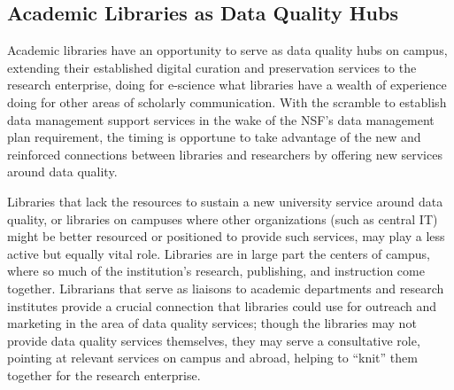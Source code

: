 \documentclass[jou,12pt]{apa6}
\begin{document}
\subsection{Academic Libraries as Data Quality Hubs}

Academic libraries have an opportunity to serve as data quality hubs
on campus, extending their established digital curation and
preservation services to the research enterprise, doing for e-science
what libraries have a wealth of experience doing for other areas of
scholarly communication. With the scramble to establish data
management support services in the wake of the NSF's data management
plan requirement, the timing is opportune to take advantage of the new
and reinforced connections between libraries and researchers by
offering new services around data quality.

%

Libraries that lack the resources to sustain a new university service
around data quality, or libraries on campuses where other
organizations (such as central IT) might be better resourced or
positioned to provide such services, may play a less active but
equally vital role. Libraries are in large part the centers of campus,
where so much of the institution's research, publishing, and
instruction come together. Librarians that serve as liaisons to
academic departments and research institutes provide a crucial
connection that libraries could use for outreach and marketing in the
area of data quality services; though the libraries may not provide
data quality services themselves, they may serve a consultative role,
pointing at relevant services on campus and abroad, helping to
``knit'' them together for the research enterprise.
\end{document}
